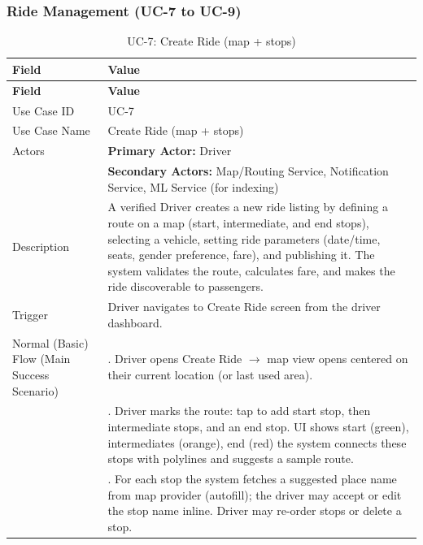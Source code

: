 \subsubsection{Ride Management (UC-7 to UC-9)}

\begin{longtable}{|>{\raggedright\arraybackslash}p{4cm}|>{\raggedright\arraybackslash}p{11cm}|}
\caption{UC-7: Create Ride (map + stops)}
\label{tab:uc-7} \\
\hline
\rowcolor{lightgray!30}
\textbf{Field} & \textbf{Value} \\
\hline
\endfirsthead
\hline
\rowcolor{lightgray!30}
\textbf{Field} & \textbf{Value} \\
\hline
\endhead
\hline
\endfoot
\hline
\endlastfoot
Use Case ID & UC-7 \\
\hline
Use Case Name & Create Ride (map + stops) \\
\hline
Actors & \textbf{Primary Actor:} Driver \\
& \textbf{Secondary Actors:} Map/Routing Service, Notification Service, ML Service (for indexing) \\
\hline
Description & A verified Driver creates a new ride listing by defining a route on a map (start, intermediate, and end stops), selecting a vehicle, setting ride parameters (date/time, seats, gender preference, fare), and publishing it. The system validates the route, calculates fare, and makes the ride discoverable to passengers. \\
\hline
Trigger & Driver navigates to Create Ride screen from the driver dashboard. \\
\hline
Normal (Basic) Flow (Main Success Scenario) & 1. Driver opens Create Ride $\rightarrow$ map view opens centered on their current location (or last used area). \\
& 2. Driver marks the route: tap to add start stop, then intermediate stops, and an end stop. UI shows start (green), intermediates (orange), end (red) the system connects these stops with polylines and suggests a sample route. \\
& 3. For each stop the system fetches a suggested place name from map provider (autofill); the driver may accept or edit the stop name inline. Driver may re-order stops or delete a stop. \\

\end{longtable}
